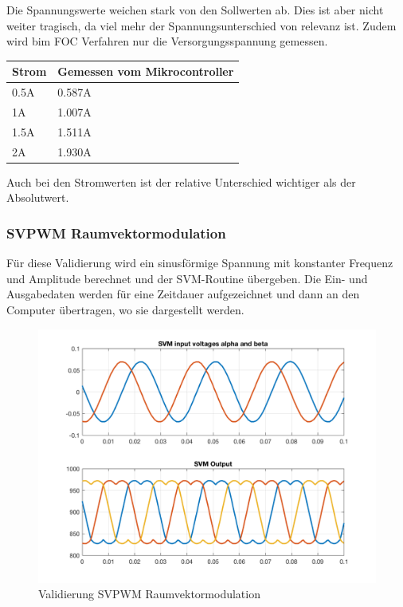 Die Spannungswerte weichen stark von den Sollwerten ab. Dies ist aber nicht weiter tragisch, da viel mehr der Spannungsunterschied von relevanz ist. Zudem wird bim FOC Verfahren nur die Versorgungsspannung gemessen.

\begin{center}
	\begin{tabular}{|l|l|}
		\hline 
		Strom & Gemessen vom Mikrocontroller \\ \hline
		0.5A & 0.587A\\ \hline
		1A & 1.007A\\ \hline
		1.5A & 1.511A\\ \hline
		2A & 1.930A\\ \hline
	\end{tabular} 
	\label{tab:stromsw}
\end{center}

Auch bei den Stromwerten ist der relative Unterschied wichtiger als der Absolutwert.

\subsubsection*{SVPWM Raumvektormodulation}
Für diese Validierung wird ein sinusförmige Spannung mit konstanter Frequenz und Amplitude berechnet und der SVM-Routine übergeben. Die Ein- und Ausgabedaten werden für eine Zeitdauer aufgezeichnet und dann an den Computer übertragen, wo sie dargestellt werden.

\begin{figure} [H]
	\centering
	\includegraphics[width=0.8\linewidth]{images/valmcsvm.png}
	\caption{Validierung SVPWM Raumvektormodulation}
	\label{fig:svpwm}
\end{figure}

